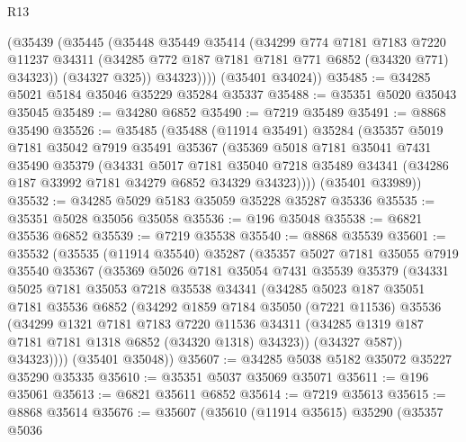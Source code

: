 \begin{lexlean}{R13}
\begin{coremodule}
          (@35439
            (@35445
              (@35448
                @35449
                @35414
                (@34299
                  @774
                  @7181
                  @7183
                  @7220
                  @11237
                  @34311
                  (@34285 @772 @187 @7181 @7181 @771 @6852 (@34320 @771) @34323))
                (@34327 @325))
              @34323))))
      (@35401 @34024))
@35485 := @34285 @5021 @5184 @35046 @35229 @35284 @35337
@35488 := @35351 @5020 @35043 @35045
@35489 := @34280 @6852
@35490 := @7219 @35489
@35491 := @8868 @35490
@35526 := @35485
    (@35488
      (@11914 @35491)
      @35284
      (@35357
        @5019
        @7181
        @35042
        @7919
        @35491
        @35367
        (@35369
          @5018
          @7181
          @35041
          @7431
          @35490
          @35379
          (@34331
            @5017
            @7181
            @35040
            @7218
            @35489
            @34341
            (@34286 @187 @33992 @7181 @34279 @6852 @34329 @34323))))
      (@35401 @33989))
@35532 := @34285 @5029 @5183 @35059 @35228 @35287 @35336
@35535 := @35351 @5028 @35056 @35058
@35536 := @196 @35048
@35538 := @6821 @35536 @6852
@35539 := @7219 @35538
@35540 := @8868 @35539
@35601 := @35532
    (@35535
      (@11914 @35540)
      @35287
      (@35357
        @5027
        @7181
        @35055
        @7919
        @35540
        @35367
        (@35369
          @5026
          @7181
          @35054
          @7431
          @35539
          @35379
          (@34331
            @5025
            @7181
            @35053
            @7218
            @35538
            @34341
            (@34285
              @5023
              @187
              @35051
              @7181
              @35536
              @6852
              (@34292
                @1859
                @7184
                @35050
                (@7221 @11536)
                @35536
                (@34299
                  @1321
                  @7181
                  @7183
                  @7220
                  @11536
                  @34311
                  (@34285 @1319 @187 @7181 @7181 @1318 @6852 (@34320 @1318) @34323))
                (@34327 @587))
              @34323))))
      (@35401 @35048))
@35607 := @34285 @5038 @5182 @35072 @35227 @35290 @35335
@35610 := @35351 @5037 @35069 @35071
@35611 := @196 @35061
@35613 := @6821 @35611 @6852
@35614 := @7219 @35613
@35615 := @8868 @35614
@35676 := @35607
    (@35610
      (@11914 @35615)
      @35290
      (@35357
        @5036

\end{coremodule}
\end{lexlean}
